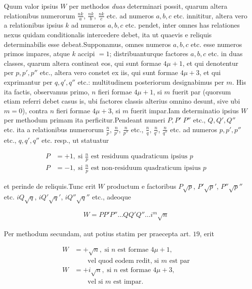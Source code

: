 Quum valor ipsius $W$ per methodos \textit{duas} determinari possit, quarum altera relationibus numerorum $\frac{nk}{a}$, $\frac{nk}{b}$, $\frac{nk}{c}$ etc. ad numeros $a,b,c$ etc. innititur, altera vero a relationibus ipsius $k$ ad numeros $a,b,c$ etc. pendet, inter omnes has relationes nexus quidam conditionalis intercedere debet, ita ut quaevis e reliquis determinabilis esse debeat.\quad Supponamus, omnes numeros $a,b,c$ etc. esse numeros primos impares, atque $k$ accipi $=1$; distribuanturque factores $a,b,c$ etc. in duas classes, quarum altera contineat eos, qui sunt formae $4\mu+1$, et qui denotentur per $p,p',p''$ etc., altera vero constet ex iis, qui sunt formae $4\mu+3$, et qui exprimantur per $q,q',q''$ etc.: multitudinem posteriorum designabimus per $m$. His ita factis, observamus primo, $n$ fieri formae $4\mu+1$, si $m$ fuerit par (quorsum etiam referri debet casus is, ubi factores classis alterius omnino desunt, sive ubi $m=0$), contra $n$ fieri formae $4\mu+3$, si $m$ fuerit impar.\quad Iam determinatio
%
ipsius $W$ per methodum primam ita perficitur.\quad Pendeant numeri $P,P'\;P''$ etc., $Q,Q',Q''$ etc. ita a relationibus numerorum $\frac{n}{p}$, $\frac{n}{p'}$, $\frac{n}{p''}$ etc., $\frac{n}{q}$, $\frac{n}{q'}$, $\frac{n}{q''}$ etc. ad numeros $p,p',p''$ etc., $q,q',q''$ etc. resp., ut statuatur

\[
\begin{aligned}
P&=+1,\;\text{si }\frac{n}{p}\text{ est residuum quadraticum ipsius }p\\
P&=-1,\;\text{si }\frac{n}{p}\text{ est non-residuum quadraticum ipsius }p
\end{aligned}
\]

et perinde de reliquis.\quad Tunc erit $W$ productum e factoribus $P\surd p$, $P'\surd p'$, $P''\surd p''$ etc. $iQ\surd q$, $iQ'\surd q'$, $iQ''\surd q''$ etc., adeoque

\[
\begin{aligned}
W=PP'P''\ldots QQ'Q''\ldots i^m\surd n
\end{aligned}
\]

Per methodum secundam, aut potius statim per praecepta art. $19$, erit

\[
\begin{aligned}
W&=+\surd n,\;\text{si }n\text{ est formae }4\mu+1,\\&\qquad\text{vel quod eodem redit, si }m\text{ est par}\\
W&=+i\surd n,\;\text{si }n\text{ est formae }4\mu+3,\\&\qquad\text{vel si }m\text{ est impar.}
\end{aligned}
\]

